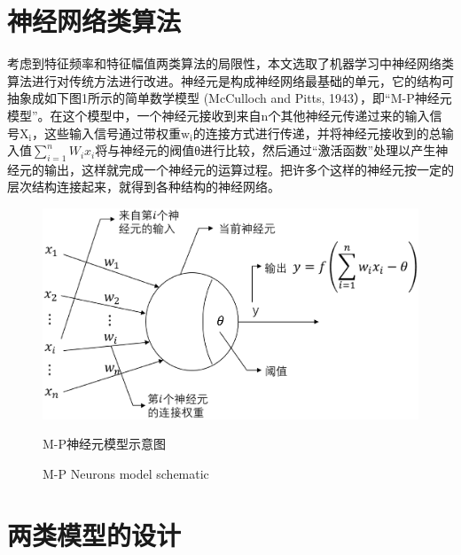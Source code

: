 \section{神经网络类算法}
\indent 考虑到特征频率和特征幅值两类算法的局限性，本文选取了机器学习中神经网络类算法进行对传统方法进行改进。神经元是构成神经网络最基础的单元，它的结构可抽象成如下图1所示的简单数学模型 (McCulloch and Pitts, 1943），即“M-P神经元模型”。在这个模型中，一个神经元接收到来自n个其他神经元传递过来的输入信号$\mathrm{X}_{\mathrm{i}}$，这些输入信号通过带权重$\mathrm{w}_{\mathrm{i}}$的连接方式进行传递，并将神经元接收到的总输入值$\sum_{i=1}^{n} W_{i} x_{i}$将与神经元的阀值θ进行比较，然后通过“激活函数”处理以产生神经元的输出，这样就完成一个神经元的运算过程。把许多个这样的神经元按一定的层次结构连接起来，就得到各种结构的神经网络。
\begin{figure}[!h] 
\centering 
 \includegraphics[width=0.75\linewidth]{img/mp.eps} 
 \renewcommand{\figurename}{图} 
\caption{M-P神经元模型示意图} 
\addtocounter{figure}{-1} \vspace{-5pt} 
\renewcommand{\figurename}{Fig} 
\caption{M-P Neurons model schematic} 
\renewcommand{\figurename}{图} 
\label{fig:network-device-influence.png} 
\end{figure}
\section{两类模型的设计}

